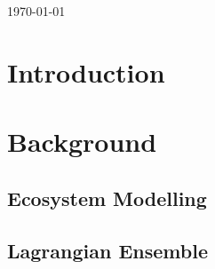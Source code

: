 \documentclass[10pt, a4paper]{report}
\begin{document}
\begin{titlepage}


{\large \today}\\[3cm] %




\vfill %
\end{titlepage}


\tableofcontents




\chapter{Introduction}\label{ch:intro}


\chapter{Background}\label{ch:bkg}

\section{Ecosystem Modelling}\label{sec:ecomodel}

\section{Lagrangian Ensemble}\label{sec:le}
\end{document}
